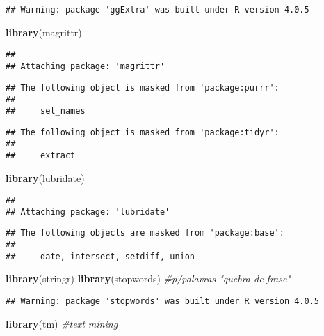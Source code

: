 \documentclass[
]{article}
\newenvironment{Shaded}{\begin{snugshade}}{\end{snugshade}}
\newcommand{\CommentTok}[1]{\textcolor[rgb]{0.56,0.35,0.01}{\textit{#1}}}
\newcommand{\KeywordTok}[1]{\textcolor[rgb]{0.13,0.29,0.53}{\textbf{#1}}}
\newcommand{\NormalTok}[1]{#1}
\begin{document}
\begin{verbatim}
## Warning: package 'ggExtra' was built under R version 4.0.5
\end{verbatim}

\begin{Shaded}
\begin{Highlighting}[]
\KeywordTok{library}\NormalTok{(magrittr)}
\end{Highlighting}
\end{Shaded}

\begin{verbatim}
## 
## Attaching package: 'magrittr'
\end{verbatim}

\begin{verbatim}
## The following object is masked from 'package:purrr':
## 
##     set_names
\end{verbatim}

\begin{verbatim}
## The following object is masked from 'package:tidyr':
## 
##     extract
\end{verbatim}

\begin{Shaded}
\begin{Highlighting}[]
\KeywordTok{library}\NormalTok{(lubridate)}
\end{Highlighting}
\end{Shaded}

\begin{verbatim}
## 
## Attaching package: 'lubridate'
\end{verbatim}

\begin{verbatim}
## The following objects are masked from 'package:base':
## 
##     date, intersect, setdiff, union
\end{verbatim}

\begin{Shaded}
\begin{Highlighting}[]
\KeywordTok{library}\NormalTok{(stringr) }
\KeywordTok{library}\NormalTok{(stopwords)      }\CommentTok{#p/palavras "quebra de frase"}
\end{Highlighting}
\end{Shaded}

\begin{verbatim}
## Warning: package 'stopwords' was built under R version 4.0.5
\end{verbatim}

\begin{Shaded}
\begin{Highlighting}[]
\KeywordTok{library}\NormalTok{(tm)             }\CommentTok{#text mining}
\end{Highlighting}
\end{Shaded}
\end{document}
